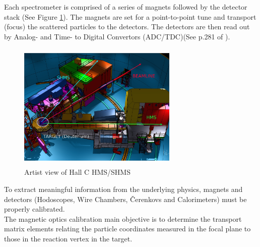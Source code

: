 \documentclass[8pt, twocolumn]{article}
\begin{document}
\indent Each spectrometer is comprised of a series of magnets followed by the detector stack (See Figure \ref{fig:Figure9}). The magnets
are set for a point-to-point tune and transport (focus) the scattered particles
to the detectors. The detectors are then read out by Analog- and Time- to Digital Convertors (ADC/TDC)(See p.281 of \cite{Leo}). 
\begin{figure}[h]
  \centering
  \includegraphics[width=3.0in, height=2.4in]{HMS_SHMS.jpg}
  \caption{Artist view of Hall C HMS/SHMS}
  \label{fig:Figure9}
\end{figure}
To extract meaningful information from the underlying physics, 
magnets and detectors (Hodoscopes, Wire Chambers, \v{C}erenkovs and Calorimeters) must be properly calibrated. \\ 
\indent The magnetic optics calibration main objective is to determine the transport matrix elements relating the
particle coordinates measured in the focal plane to those in the reaction vertex in the target. 
\end{document}
